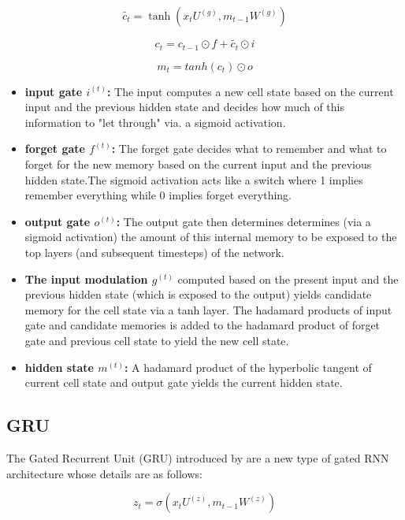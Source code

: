 \begin{equation}
\widetilde {c_t}= \tanh(x_t U^{(g)}, m_{t-1}W^{(g)})
\end{equation}

\begin{equation}
c_t = c_{t-1} \odot f + \widetilde{c_t} \odot i
\end{equation}

\begin{equation}
m_t = tanh(c_t) \odot o
\end{equation}

\begin{itemize}
	\item \textbf{input gate $i^{(t)}$:} The input computes a new cell state based on the current input and the previous hidden state and decides how much of this information to "let through" via. a sigmoid activation.
	\item \textbf{forget gate $f^{(t)}$:} The forget gate decides what to remember and what to forget for the new memory based on the current input and the previous hidden state.The sigmoid activation acts like a switch where 1 implies remember everything while 0 implies forget everything.
	\item \textbf{output gate $o^{(t)}$:} The output gate then determines determines (via a sigmoid activation) the amount of this internal memory to be exposed to the top layers (and subsequent timesteps) of the network.
	\item \textbf{The input modulation $g^{(t)}$} computed based on the present input and the previous hidden state (which is exposed to the output) yields candidate memory for the cell state via a tanh layer. The hadamard products of input gate and candidate memories is added to the hadamard product of forget gate and previous cell state to yield the new cell state.
	\item \textbf{hidden state $m^{(t)}$:} A hadamard product of the hyperbolic tangent of current cell state and output gate yields the current hidden state.
\end{itemize}

\subsection{GRU}
The Gated Recurrent Unit (GRU) introduced by \cite{GRU} are a new type of gated RNN architecture whose details are as follows:

\begin{equation}
z_t= \sigma(x_t U^{(z)}, m_{t-1}W^{(z)})
\end{equation}

